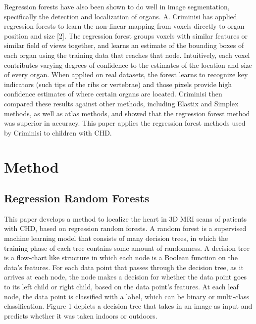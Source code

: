 Regression forests have also been shown to do well in image segmentation, specifically the detection and localization of organs. A. Criminisi has applied regression forests to learn the non-linear mapping from voxels directly to organ position and size [2]. The regression forest groups voxels with similar features or similar field of views together, and learns an estimate of the bounding boxes of each organ using the training data that reaches that node. Intuitively, each voxel contributes varying degrees of confidence to the estimates of the location and size of every organ. When applied on real datasets, the forest learns to recognize key indicators (such tips of the ribs or vertebrae) and those pixels provide high confidence estimates of where certain organs are located. Criminisi then compared these results against other methods, including Elastix and Simplex methods, as well as atlas methods, and showed that the regression forest method was superior in accuracy. This paper applies the regression forest methods used by Criminisi to children with CHD.

\section{Method}
\subsection{Regression Random Forests}
This paper develops a method to localize the heart in 3D MRI scans of patients with CHD, based on regression random forests. A random forest is a supervised machine learning model that consists of many decision trees, in which the training phase of each tree contains some amount of randomness. A decision tree is a flow-chart like structure in which each node is a Boolean function on the data's features. For each data point that passes through the decision tree, as it arrives at each node, the node makes a decision for whether the data point goes to its left child or right child, based on the data point's features. At each leaf node, the data point is classified with a label, which can be binary or multi-class classification. Figure 1 depicts a decision tree that takes in an image as input and predicts whether it was taken indoors or outdoors.

